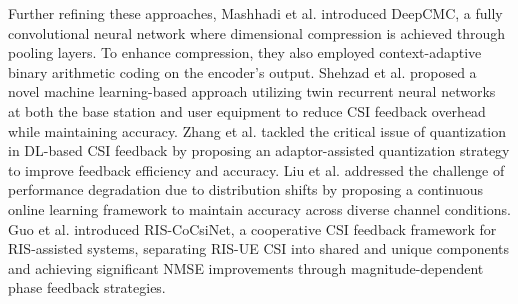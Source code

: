 \documentclass[lettersize,journal]{IEEEtran}
\begin{document}
Further refining these approaches, Mashhadi et al. \cite{mashhadi2020deepcmc} introduced DeepCMC, a fully convolutional neural network where dimensional compression is achieved through pooling layers. To enhance compression, they also employed context-adaptive binary arithmetic coding on the encoder's output. Shehzad et al. \cite{shehzad2021design} proposed a novel machine learning-based approach utilizing twin recurrent neural networks at both the base station and user equipment to reduce CSI feedback overhead while maintaining accuracy. Zhang et al. \cite{zhang2022quantization} tackled the critical issue of quantization in DL-based CSI feedback by proposing an adaptor-assisted quantization strategy to improve feedback efficiency and accuracy. Liu et al. \cite{liu2023continuous} addressed the challenge of performance degradation due to distribution shifts by proposing a continuous online learning framework to maintain accuracy across diverse channel conditions. Guo et al. \cite{guo2023ris} introduced RIS-CoCsiNet, a cooperative CSI feedback framework for RIS-assisted systems, separating RIS-UE CSI into shared and unique components and achieving significant NMSE improvements through magnitude-dependent phase feedback strategies.
\end{document}
